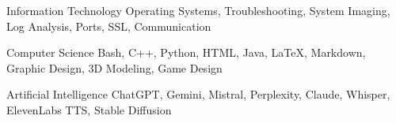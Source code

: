 
\begin{cvskills}

  \cvskill
    {Information Technology} %
    {Operating Systems, Troubleshooting, System Imaging, Log Analysis, Ports, SSL, Communication} %

  \cvskill
    {Computer Science} %
    {Bash, C++, Python, HTML, Java, LaTeX, Markdown, Graphic Design, 3D Modeling, Game Design} %

  \cvskill
    {Artificial Intelligence} %
	{ChatGPT, Gemini, Mistral, Perplexity, Claude, Whisper, ElevenLabs TTS, Stable Diffusion} %

\end{cvskills}
